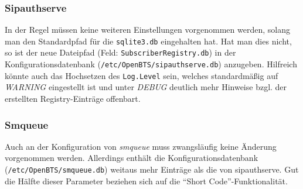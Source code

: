 \subsubsection{Sipauthserve}
In der Regel müssen keine weiteren Einstellungen vorgenommen werden, solang man den Standardpfad für die \verb|sqlite3.db| eingehalten hat. Hat man dies nicht, so ist der neue Dateipfad (Feld: \verb|SubscriberRegistry.db|) in der Konfigurationsdatenbank (\verb|/etc/OpenBTS/sipauthserve.db|) anzugeben. Hilfreich könnte auch das Hochsetzen des \verb|Log.Level| sein, welches standardmäßig auf \textit{WARNING} eingestellt ist und unter \textit{DEBUG} deutlich mehr Hinweise bzgl. der erstellten Registry-Einträge offenbart.

\subsubsection{Smqueue}
Auch an der Konfiguration von \textit{smqueue} muss zwangsläufig keine Änderung vorgenommen werden. Allerdings enthält die Konfigurationsdatenbank (\verb|/etc/OpenBTS/smqueue.db|) weitaus mehr Einträge als die von sipauthserve. Gut die Hälfte dieser Parameter beziehen sich auf die "`Short Code"'-Funktionalität.


